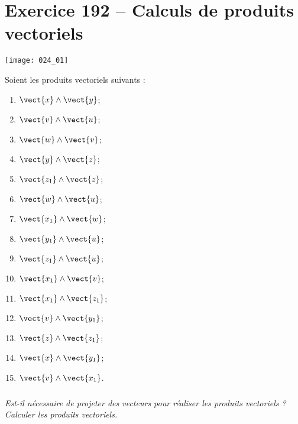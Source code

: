 \section*{Exercice 192 -- Calculs de produits vectoriels}
\setcounter{exo}{0}


\begin{center}
\texttt{[image: 024\_01]}
\end{center}

Soient les produits vectoriels suivants : 
\begin{multicols}{3}
\begin{enumerate}
\item $\vect{x}\wedge\vect{y}$;
\item $\vect{v}\wedge\vect{u}$;
\item $\vect{w}\wedge\vect{v}$;
\item $\vect{y}\wedge\vect{z}$;
\item $\vect{z_1}\wedge\vect{z}$;
\item $\vect{w}\wedge\vect{u}$;
\item $\vect{x_1}\wedge\vect{w}$;
\item $\vect{y_1}\wedge\vect{u}$;
\item $\vect{z_1}\wedge\vect{u}$;
\item $\vect{x_1}\wedge\vect{v}$;
\item $\vect{x_1}\wedge\vect{z_1}$;
\item $\vect{v}\wedge\vect{y_1}$;
\item $\vect{z}\wedge\vect{z_1}$;
\item $\vect{x}\wedge\vect{y_1}$;
\item $\vect{v}\wedge\vect{x_1}$.
\end{enumerate}
\end{multicols}
\subparagraph{}
\textit{Est-il nécessaire de projeter des vecteurs pour réaliser les produits vectoriels ? Calculer les produits vectoriels.}


